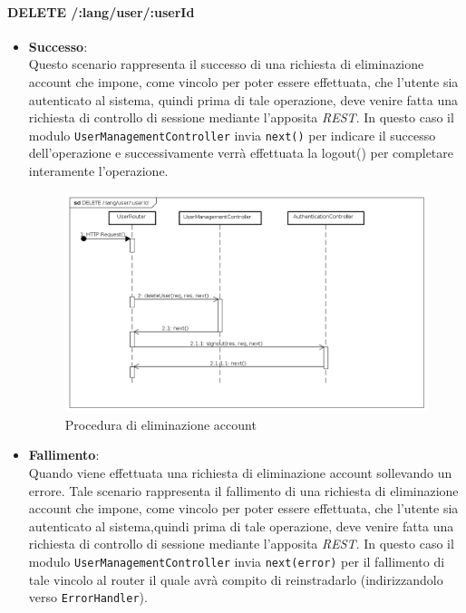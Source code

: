 
\paragraph{DELETE /:lang/user/:userId}
\begin{itemize}
\item \textbf{Successo}: \\
Questo scenario rappresenta il successo di una richiesta di eliminazione account che impone, come vincolo per poter essere effettuata, che l'utente sia autenticato al sistema, quindi prima di tale operazione, deve venire fatta una richiesta di controllo di sessione mediante l'apposita \textit{REST}.
In questo caso il modulo \texttt{UserManagementController} invia \texttt{next()} per indicare il successo dell'operazione e successivamente verrà effettuata la logout() per completare interamente l'operazione.
\label{Procedura di eliminazione account}
\begin{figure}[ht]
	\centering
	\includegraphics[scale=0.40]{UML/DiagrammiDiSequenza/Back-end/DELETE_LangUserUseridSuccess.png}
	\caption{Procedura di eliminazione account}
\end{figure}
\FloatBarrier

\item \textbf{Fallimento}: \\
Quando viene effettuata una richiesta di eliminazione account sollevando un errore. Tale scenario rappresenta il fallimento di una richiesta di eliminazione account che impone, come vincolo per poter essere effettuata, che l'utente sia autenticato al sistema,quindi prima di tale operazione, deve venire fatta una richiesta di controllo di sessione mediante l'apposita \textit{REST}. In questo caso il modulo \texttt{UserManagementController} invia \texttt{next(error)} per il fallimento di tale vincolo al router il quale avrà compito di reinstradarlo (indirizzandolo verso \texttt{ErrorHandler}).


\end{itemize}
